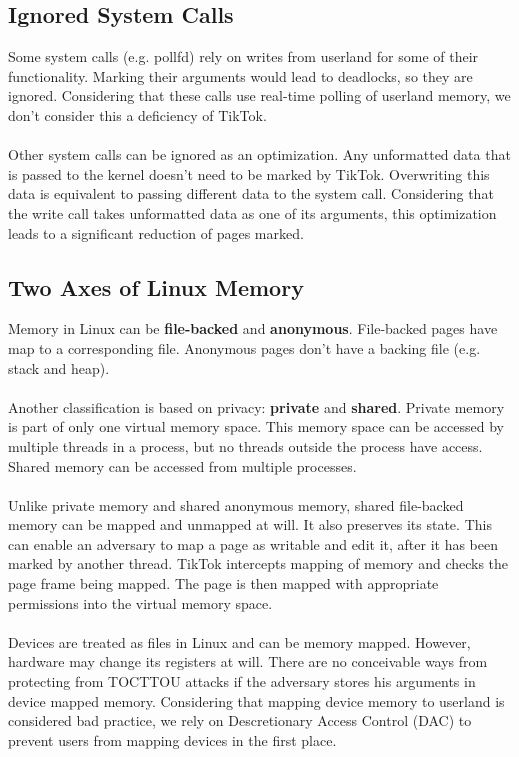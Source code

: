 \documentclass[conference]{IEEEtran}
\begin{document}
\subsection{Ignored System Calls}

Some system calls (e.g. pollfd) rely on writes from userland for some of their functionality. Marking their arguments
would lead to deadlocks, so they are ignored. Considering that these calls use real-time polling of userland memory,
we don't consider this a deficiency of TikTok.
\\
\\
Other system calls can be ignored as an optimization. Any unformatted data that is passed to the kernel doesn't need
to be marked by TikTok. Overwriting this data is equivalent to passing different data to the system call. Considering
that the write call takes unformatted data as one of its arguments, this optimization leads to a significant reduction
of pages marked.

\subsection{Two Axes of Linux Memory}

Memory in Linux can be \textbf{file-backed} and \textbf{anonymous}. File-backed pages have map to a corresponding file. 
Anonymous pages don't have a backing file (e.g. stack and heap).
\\
\\
Another classification is based on privacy: \textbf{private} and \textbf{shared}. Private memory is part of only one virtual memory space.
This memory space can be accessed by multiple threads in a process, but no threads outside the process have access.
Shared memory can be accessed from multiple processes.
\\
\\
Unlike private memory and shared anonymous memory, shared file-backed memory can be mapped and unmapped at will. It 
also preserves its state. This can enable an adversary to map a page as writable and edit it, after it has been marked 
by another thread. TikTok intercepts mapping of memory and checks the page frame being mapped. The page is then mapped
with appropriate permissions into the virtual memory space.
\\
\\
Devices are treated as files in Linux and can be memory mapped. However, hardware may change its registers at will.
There are no conceivable ways from protecting from TOCTTOU attacks if the adversary stores his arguments in device
mapped memory. Considering that mapping device memory to userland is considered bad practice, we rely on Descretionary
Access Control (DAC) to prevent users from mapping devices in the first place.
\end{document}
